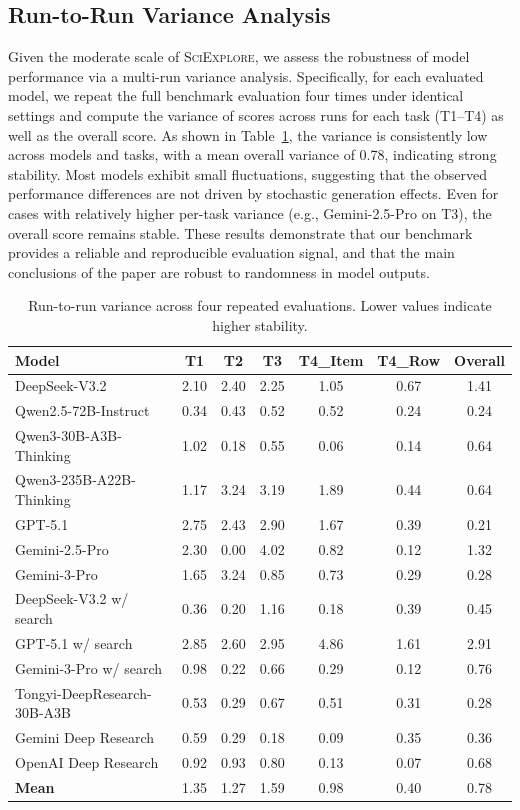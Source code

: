 \subsection{Run-to-Run Variance Analysis}
\label{app:variance_analysis}

Given the moderate scale of \textsc{SciExplore}, we assess the robustness of model performance via a multi-run variance analysis. Specifically, for each evaluated model, we repeat the full benchmark evaluation four times under identical settings and compute the variance of scores across runs for each task (T1--T4) as well as the overall score. As shown in Table~\ref{tab:variance_results}, the variance is consistently low across models and tasks, with a mean overall variance of 0.78, indicating strong stability. Most models exhibit small fluctuations, suggesting that the observed performance differences are not driven by stochastic generation effects. Even for cases with relatively higher per-task variance (e.g., Gemini-2.5-Pro on T3), the overall score remains stable. These results demonstrate that our benchmark provides a reliable and reproducible evaluation signal, and that the main conclusions of the paper are robust to randomness in model outputs.

\begin{table}[t]
\centering
\caption{Run-to-run variance across four repeated evaluations. Lower values indicate higher stability.}
\label{tab:variance_results}
\small
\begin{tabular}{lcccccc}
\toprule
\textbf{Model} & \textbf{T1} & \textbf{T2} & \textbf{T3} & \textbf{T4\_Item} & \textbf{T4\_Row} & \textbf{Overall} \\
\midrule
DeepSeek-V3.2 & 2.10 & 2.40 & 2.25 & 1.05 & 0.67 & 1.41 \\
Qwen2.5-72B-Instruct & 0.34 & 0.43 & 0.52 & 0.52 & 0.24 & 0.24 \\
Qwen3-30B-A3B-Thinking & 1.02 & 0.18 & 0.55 & 0.06 & 0.14 & 0.64 \\
Qwen3-235B-A22B-Thinking & 1.17 & 3.24 & 3.19 & 1.89 & 0.44 & 0.64 \\
GPT-5.1 & 2.75 & 2.43 & 2.90 & 1.67 & 0.39 & 0.21 \\
Gemini-2.5-Pro & 2.30 & 0.00 & 4.02 & 0.82 & 0.12 & 1.32 \\
Gemini-3-Pro & 1.65 & 3.24 & 0.85 & 0.73 & 0.29 & 0.28 \\
DeepSeek-V3.2 w/ search & 0.36 & 0.20 & 1.16 & 0.18 & 0.39 & 0.45 \\
GPT-5.1 w/ search & 2.85 & 2.60 & 2.95 & 4.86 & 1.61 & 2.91 \\
Gemini-3-Pro w/ search & 0.98 & 0.22 & 0.66 & 0.29 & 0.12 & 0.76 \\
Tongyi-DeepResearch-30B-A3B & 0.53 & 0.29 & 0.67 & 0.51 & 0.31 & 0.28 \\
Gemini Deep Research & 0.59 & 0.29 & 0.18 & 0.09 & 0.35 & 0.36 \\
OpenAI Deep Research & 0.92 & 0.93 & 0.80 & 0.13 & 0.07 & 0.68 \\
\midrule
\textbf{Mean} & 1.35 & 1.27 & 1.59 & 0.98 & 0.40 & 0.78 \\
\bottomrule
\end{tabular}
\end{table}


